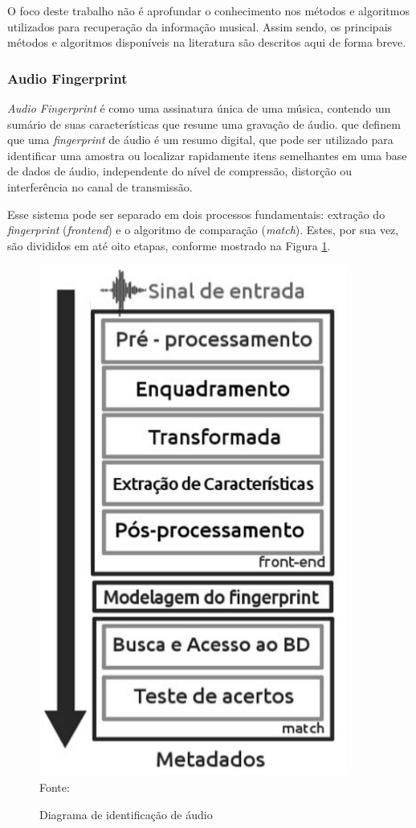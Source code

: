 O foco deste trabalho não é aprofundar o conhecimento nos métodos e algoritmos utilizados para recuperação da informação musical. Assim sendo, os principais métodos e algoritmos disponíveis na literatura são descritos aqui de forma breve.

\subsubsection{Audio Fingerprint} \label{subsubsec:audioFingerprint}
\textit{Audio Fingerprint} é como uma assinatura única de uma música, contendo um sumário de suas características que resume uma gravação de áudio.  que definem que uma \textit{fingerprint} de áudio é um resumo digital, que pode ser utilizado para identificar uma amostra ou localizar rapidamente itens semelhantes em uma base de dados de áudio, independente do nível de compressão, distorção ou interferência no canal de transmissão.

Esse sistema pode ser separado em dois processos fundamentais: extração do \textit{fingerprint} (\textit{frontend}) e o algoritmo de comparação (\textit{match}). Estes, por sua vez, são divididos em até oito etapas, conforme mostrado na Figura \ref{fig:etapasFinger}.

\begin{figure}[!htb]
   \centering
   \caption{Diagrama de identificação de áudio} \label{fig:etapasFinger} 
   \includegraphics[scale=0.47]{figuras/etapasFinger.png}
   \\Fonte: \cite{carreira2015}
\end{figure}

